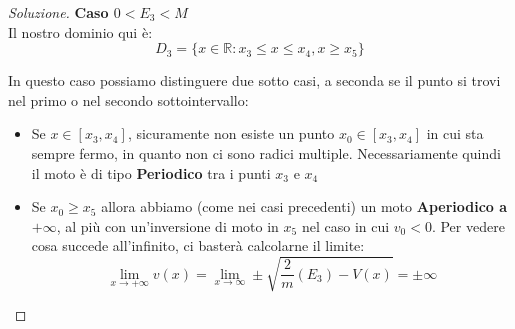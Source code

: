 \documentclass[11pt,a4paper,twoside]{article}
\theoremstyle{definition}
\newenvironment{sol}
	{\renewcommand\qedsymbol{$\blacksquare$}\begin{proof}[Soluzione]}
	{\end{proof}}
\begin{document}
\begin{sol}
	\textbf{Caso $0<E_3<M$}\\
	Il nostro dominio qui è:
	\[ D_3 = \{x \in \mathbb R: x_3\leq x \leq x_4, x\geq x_5\} \]
	\begin{center}
	\end{center}
	In questo caso possiamo distinguere due sotto casi, a seconda se il punto si trovi nel primo o nel secondo sottointervallo:
	\begin{itemize}
		\item Se $x \in [x_3,x_4]$, sicuramente non esiste un punto $x_0 \in [x_3,x_4]$ in cui sta sempre fermo, in quanto non ci sono radici multiple. Necessariamente quindi il moto è di tipo \textbf{Periodico} tra i punti $x_3$ e $x_4$
		\item Se $x_0\geq x_5$ allora abbiamo (come nei casi precedenti) un moto \textbf{Aperiodico a $+\infty$}, al più con un'inversione di moto in $x_5$ nel caso in cui $v_0<0$. Per vedere cosa succede all'infinito, ci basterà calcolarne il limite:
			\[ \lim_{x \to + \infty}v(x) = \lim_{x \to \infty} \pm \sqrt{\frac 2m(E_3) - V(x)} = \pm \infty \]
	\end{itemize}


\end{sol}
\end{document}

